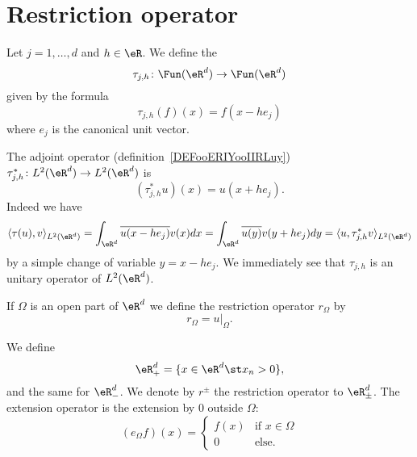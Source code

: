 \section{Restriction operator}

\begin{definition}
    Let \( j=1,\ldots, d\) and \( h\in \eR\). We define the 
    \begin{equation}
        \tau_{j,h}\colon \Fun(\eR^d)\to \Fun(\eR^d)
    \end{equation}
    given by the formula
    \begin{equation}
        \tau_{j,h}(f)(x)=f(x-h e_j)
    \end{equation}
    where \( e_j\) is the canonical unit vector.
\end{definition}

The adjoint operator (definition~\ref{DEFooERIYooIIRLuy}) \( \tau^*_{j,h}\colon L^2(\eR^d)\to L^2(\eR^d)\) is
\begin{equation}
    (\tau^*_{j,h}u)(x)=u(x+he_j).
\end{equation}
Indeed we have
\begin{equation}
    \langle \tau(u), v\rangle_{L^2(\eR^d)}=\int_{\eR^d}\overline{ u(x-he_j) }v(x)dx=\int_{\eR^d}\overline{ u(y) }v(y+he_j)dy=\langle u, \tau^*_{j,h}v\rangle_{L^2(\eR^d)}
\end{equation}
by a simple change of variable \( y=x-he_j\). We immediately see that \( \tau_{j,h}\) is an unitary operator of \( L^2(\eR^d)\).

If \( \Omega\) is an open part of \( \eR^d\) we define the restriction operator \( r_{\Omega}\) by
\begin{equation}
    r_{\Omega}=u|_{\Omega}.
\end{equation}

We define
\begin{equation}
    \eR^d_{+}=\{ x\in \eR^d\st x_n>0 \},
\end{equation}
and the same for \( \eR^d_-\). We denote by \( r^{\pm}\) the restriction operator to \( \eR^d_{\pm}\). The extension operator is the extension by \( 0\) outside \( \Omega\):
\begin{equation}
    (e_{\Omega}f)(x)=\begin{cases}
        f(x)    &   \text{if } x\in \Omega\\
        0    &    \text{else. }
    \end{cases}
\end{equation}

